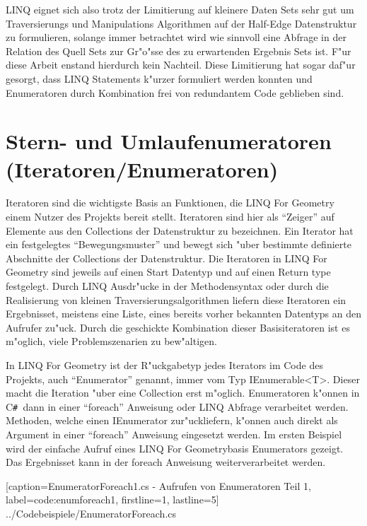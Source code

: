 \documentclass[pagesize, paper=a4, fontsize=12pt,titlepage=true, headings=small, headnosepline, abstractoff, liststotoc, nochapterprefix, plainheadsepline]{scrreprt}
\newcommand{\CSS}{C\texttt{\# }}
\newcommand{\LFG}{LINQ For Geometry}
\newcommand{\LFGS}{LINQ For Geometry }
\newcommand{\HES}{Half-Edge Datenstruktur }
\begin{document}
LINQ eignet sich also trotz der Limitierung auf kleinere Daten Sets sehr gut um Traversierungs und Manipulations Algorithmen auf der \HES zu formulieren, solange immer betrachtet wird wie sinnvoll eine Abfrage in der Relation des Quell Sets zur Gr"o"sse des zu erwartenden Ergebnis Sets ist. F"ur diese Arbeit enstand hierdurch kein Nachteil. Diese Limitierung hat sogar daf"ur gesorgt, dass LINQ Statements k"urzer formuliert werden konnten und Enumeratoren durch Kombination frei von redundantem Code geblieben sind.
	\section {Stern- und Umlaufenumeratoren (Iteratoren/Enumeratoren) \label{part:iteratoren}}
		Iteratoren sind die wichtigste Basis an Funktionen, die \LFGS einem Nutzer des Projekts bereit stellt. Iteratoren sind hier als "`Zeiger"' auf Elemente aus den Collections der Datenstruktur zu bezeichnen. Ein Iterator hat ein festgelegtes "`Bewegungsmuster"' und bewegt sich "uber bestimmte definierte Abschnitte der Collections der Datenstruktur. Die Iteratoren in \LFGS sind jeweils auf einen Start Datentyp und auf einen Return type festgelegt. Durch LINQ Ausdr"ucke in der Methodensyntax oder durch die Realisierung von kleinen Traversierungsalgorithmen liefern diese Iteratoren ein Ergebnisset, meistens eine Liste, eines bereits vorher bekannten Datentyps an den Aufrufer zu"uck. Durch die geschickte Kombination dieser Basisiteratoren ist es m"oglich, viele Problemszenarien zu bew"altigen.

In \LFGS ist der R"uckgabetyp jedes Iterators im Code des Projekts, auch "`Enumerator"' genannt, immer vom Typ IEnumerable<T>. Dieser macht die Iteration "uber eine Collection erst m"oglich. Enumeratoren k"onnen in \CSS dann in einer "`foreach"' Anweisung oder LINQ Abfrage verarbeitet werden. Methoden, welche einen IEnumerator zur"uckliefern, k"onnen auch direkt als Argument in einer "`foreach"' Anweisung eingesetzt werden.
Im ersten Beispiel wird der einfache Aufruf eines \LFG basis Enumerators gezeigt. Das Ergebnisset kann in der foreach Anweisung weiterverarbeitet werden.


			[caption={EnumeratorForeach1.cs - Aufrufen von Enumeratoren Teil 1}, label=code:enumforeach1, firstline=1, lastline=5]
			{../Codebeispiele/EnumeratorForeach.cs}
\end{document}
